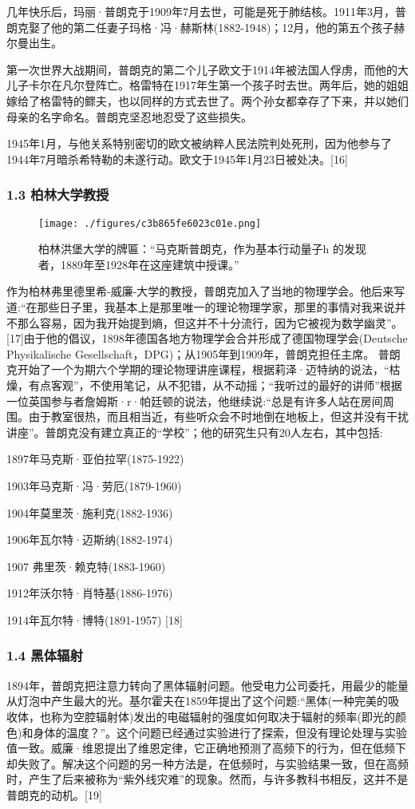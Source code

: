 几年快乐后，玛丽·普朗克于1909年7月去世，可能是死于肺结核。1911年3月，普朗克娶了他的第二任妻子玛格·冯·赫斯林(1882-1948)；12月，他的第五个孩子赫尔曼出生。

第一次世界大战期间，普朗克的第二个儿子欧文于1914年被法国人俘虏，而他的大儿子卡尔在凡尔登阵亡。格雷特在1917年生第一个孩子时去世。两年后，她的姐姐嫁给了格雷特的鳏夫，也以同样的方式去世了。两个孙女都幸存了下来，并以她们母亲的名字命名。普朗克坚忍地忍受了这些损失。

1945年1月，与他关系特别密切的欧文被纳粹人民法院判处死刑，因为他参与了1944年7月暗杀希特勒的未遂行动。欧文于1945年1月23日被处决。[16]

\subsubsection{1.3 柏林大学教授}
\begin{figure}[ht]
\centering
\texttt{[image: ./figures/c3b865fe6023c01e.png]}
\caption{柏林洪堡大学的牌匾：“马克斯普朗克，作为基本行动量子h 的发现者，1889年至1928年在这座建筑中授课。”} \label{fig_Max_3}
\end{figure}
作为柏林弗里德里希-威廉-大学的教授，普朗克加入了当地的物理学会。他后来写道:“在那些日子里，我基本上是那里唯一的理论物理学家，那里的事情对我来说并不那么容易，因为我开始提到熵，但这并不十分流行，因为它被视为数学幽灵”。[17]由于他的倡议，1898年德国各地方物理学会合并形成了德国物理学会(Deutsche Physikalische Gesellschaft，DPG)；从1905年到1909年，普朗克担任主席。
普朗克开始了一个为期六个学期的理论物理讲座课程，根据莉泽·迈特纳的说法，“枯燥，有点客观”，不使用笔记，从不犯错，从不动摇；“我听过的最好的讲师”根据一位英国参与者詹姆斯·r·帕廷顿的说法，他继续说:“总是有许多人站在房间周围。由于教室很热，而且相当近，有些听众会不时地倒在地板上，但这并没有干扰讲座”。普朗克没有建立真正的“学校”；他的研究生只有20人左右，其中包括:

1897年马克斯·亚伯拉罕(1875-1922)

1903年马克斯·冯·劳厄(1879-1960)

1904年莫里茨·施利克(1882-1936)

1906年瓦尔特·迈斯纳(1882-1974)

1907 弗里茨·赖克特(1883-1960)

1912年沃尔特·肖特基(1886-1976)

1914年瓦尔特·博特(1891-1957)  [18]

\subsubsection{1.4 黑体辐射}
1894年，普朗克把注意力转向了黑体辐射问题。他受电力公司委托，用最少的能量从灯泡中产生最大的光。基尔霍夫在1859年提出了这个问题:“黑体(一种完美的吸收体，也称为空腔辐射体)发出的电磁辐射的强度如何取决于辐射的频率(即光的颜色)和身体的温度？”。这个问题已经通过实验进行了探索，但没有理论处理与实验值一致。威廉·维恩提出了维恩定律，它正确地预测了高频下的行为，但在低频下却失败了。解决这个问题的另一种方法是，在低频时，与实验结果一致，但在高频时，产生了后来被称为“紫外线灾难”的现象。然而，与许多教科书相反，这并不是普朗克的动机。[19]


